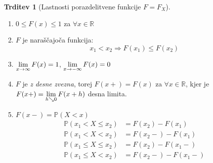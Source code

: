 \documentclass[11pt]{article}
\theoremstyle{definition}
\theoremstyle{definition}
\newtheorem{trditev}{Trditev}[section]
\theoremstyle{definition}
\begin{document}
\begin{trditev}[Lastnosti porazdelitvene funkcije $F = F_X$]
~\\
\begin{enumerate}
	\item $0 \leq F(x) \leq 1$ za $\forall x \in \mathbb{R}$
	\item  $F$ je naraščajoča funkcija:
	$$x_1 < x_2 \Rightarrow F(x_1) \leq F(x_2)$$
	\item $\mathlarger{\lim_{x \rightarrow \infty} F(x) = 1}$, $\mathlarger{\lim_{x \rightarrow -\infty} F(x) = 0}$
	\item $F$ je \textit{z desne zvezna}, torej $F(x+) = F(x)$ za $\forall x \in \mathbb{R}$, kjer je $\mathlarger{F(x+) = \lim_{h \searrow 0} F(x+h)}$ desna limita.
	\item $F(x-) = \mathbb{P}(X < x)$ 
	\begin{align*}
	\mathbb{P}(x_1 < X \leq x_2) &= F(x_2) - F(x_1) \\
	\mathbb{P}(x_1 < X < x_2) &= F(x_2-) - F(x_1) \\
	\mathbb{P}(x_1 \leq X \leq x_2) &= F(x_2) - F(x_1-) \\
	\mathbb{P}(x_1 \leq X < x_2) &= F(x_2-) - F(x_1-) 
	\end{align*}
\end{enumerate}
\end{trditev}
\vspace{0.5cm}
\end{document}
